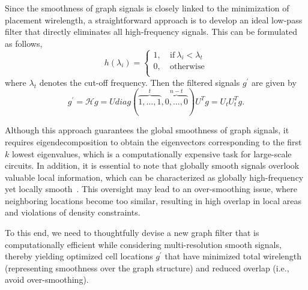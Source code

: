 Since the smoothness of graph signals is closely linked to the minimization of placement wirelength, a straightforward approach is to develop an ideal low-pass filter that directly eliminates all high-frequency signals. This can be formulated as follows,
\begin{equation}\label{eq:ideal_filter}
h(\lambda_i)=\left\{
\begin{aligned}
 1,\ &\text{if} \ \lambda_i<\lambda_t\\
 0,\ &\text{otherwise} \\
\end{aligned}
\right.
\end{equation}
where $\lambda_t$ denotes the cut-off frequency. 
Then the filtered signals $g^{\prime}$ are given by 
\begin{equation}\label{eq:unified_framework}
g^{\prime}=\mathcal{H}g=Udiag(\overbrace{1, \ldots, 1}^t, \overbrace{0,\ldots,0}^{n-t})U^Tg=U_tU_t^Tg.
\end{equation}


Although this approach guarantees the global smoothness of graph signals, it requires eigendecomposition to obtain the eigenvectors corresponding to the first $k$ lowest eigenvalues, which is a computationally expensive task for large-scale circuits.
In addition, it is essential to note that globally smooth signals overlook valuable local information, which can be characterized as globally high-frequency yet locally smooth~\cite{LLG2023}. This oversight may lead to an over-smoothing issue, where neighboring locations become too similar, resulting in high overlap in local areas and violations of density constraints.


To this end, we need to thoughtfully devise a new graph filter that is computationally efficient while considering multi-resolution smooth signals, thereby yielding optimized cell locations $g^{\prime}$ that have minimized total wirelength (representing smoothness over the graph structure) and reduced overlap (i.e., avoid over-smoothing). 



